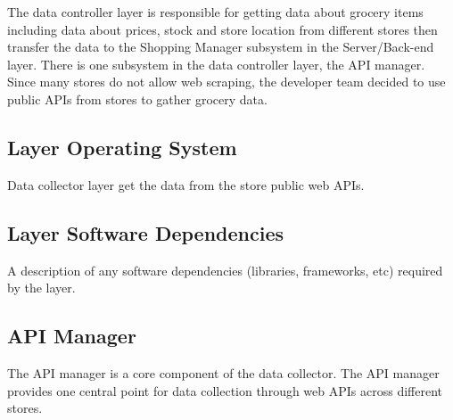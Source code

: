The data controller layer is responsible for getting data about grocery items including data about prices, stock and store location from different stores then transfer the data to the Shopping Manager subsystem in the Server/Back-end layer. There is one subsystem in the data controller layer, the API manager. Since many stores do not allow web scraping, the developer team decided to use public APIs from stores to gather grocery data.

\subsection{Layer Operating System}
Data collector layer get the data from the store public web APIs.
\subsection{Layer Software Dependencies}
A description of any software dependencies (libraries, frameworks, etc) required by the layer.

\subsection{API Manager}
The API manager is a core component of the data collector. The API manager provides one central point for data collection through web APIs across  different stores.

